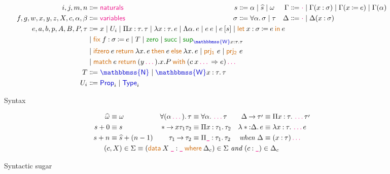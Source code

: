 \documentclass{article}
\title{}
\author{Jonathan Chan}
\newcommand{\meta}[1]{\mathsf{\textcolor{metacolour}{#1}}}
\newcommand{\ind}[1]{\mathsf{\textcolor{indcolour}{#1}}}
\newcommand{\constr}[1]{\mathsf{\textcolor{constrcolour}{#1}}}
\newcommand{\kw}[1]{\mathsf{\textcolor{kwcolour}{#1}}}
\newcommand{\kwopen}[1]{\kw{#1}\:}
\newcommand{\kwbin}[1]{\:\kw{#1}\:}
\newcommand{\pr}[1]{\raisebox{-#1pt}{$^\prime$}}
\newcommand{\taupr}{\tau\pr{2}}
\newcommand{\poly}[2]{\forall #1 \mathpunct{.} #2}
\newcommand{\suc}[1]{\widehat{#1}}
\newcommand{\fun}[3]{\Pi #1 \mathbin{:} #2 \mathpunct{.} #3}
\newcommand{\arr}[2]{#1 \mathbin{\rightarrow} #2}
\newcommand{\lam}[3]{\lambda #1 \mathbin{:} #2 \mathpunct{.} #3}
\newcommand{\Lam}[2]{\Lambda #1 \mathpunct{.} #2}
\newcommand{\app}[2]{#1 \: #2}
\newcommand{\App}[2]{#1 \: \mathopen{[} #2 \mathclose{]}}
\newcommand{\letin}[4]{\kwopen{let} \mathopen{} #1 \mathbin{:} #2 \mathbin{\coloneqq} #3 \kwbin{in} #4}
\newcommand{\Type}[1]{\ind{Type}_{#1}}
\newcommand{\Prop}[1]{\ind{Prop}_{#1}}
\newcommand{\match}[3]{\kwopen{match} #1 \kwbin{return} #2 \kwbin{with} #3}
\newcommand{\ifzero}[6]{\kwopen{ifzero} #1 \kwbin{return} \lambda #2 \mathpunct{.} #3 \kwbin{then} #4 \kwbin{else} \lambda #5 \mathpunct{.} #6}
\newcommand{\prja}[1]{\kwopen{prj_1} \;\! #1}
\newcommand{\prjb}[1]{\kwopen{prj_2} \;\! #1}
\newcommand{\fix}[3]{\kwopen{fix} #1 \mathbin{:} #2 \mathbin{\coloneqq} #3}
\newcommand{\data}[3]{\kwopen{data} #1 \mathbin{:} #2 \kwbin{where} #3}
\newcommand{\annot}[2]{#1 \mathbin{:} #2}
\newcommand{\define}[2]{#1 \mathbin{\coloneqq} #2}
\newcommand{\N}{\ind{\mathbbmss{N}}}
\newcommand{\zero}{\constr{zero}}
\renewcommand{\succ}{\constr{succ}}
\newcommand{\W}[3]{\ind{\mathbbmss{W}} #1 \mathbin{:} #2 \mathpunct{.} #3}
\renewcommand{\sup}{\ind{\constr{sup}}}
\newcommand{\nil}{\meta{\cdot}}
\newcommand{\seq}{\,\meta{\dots}\,}
\newcommand{\any}{\meta{\texttt{\_}}}
\begin{document}
\maketitle

\begin{figure}[h]
    \centering
    \begin{align*}
        i, j, m, n &\Coloneqq \meta{naturals}
        & s &\Coloneqq \alpha \mid \suc{s} \mid \omega 
        & \Gamma &\Coloneqq \nil \mid \Gamma(\annot{x}{\sigma}) \mid \Gamma(\define{x}{e}) \mid \Gamma(\alpha) \\
        f, g, w, x, y, z, X, c, \alpha, \beta &\Coloneqq \meta{variables}
        & \sigma &\Coloneqq \poly{\alpha}{\sigma} \mid \tau
        & \Delta &\Coloneqq \nil \mid \Delta(\annot{x}{\sigma}) \\
        e, a, b, p, A, B, P, \tau &\Coloneqq \mathrlap{x \mid U_{i} \mid \fun{x}{\tau}{\tau} \mid \lam{x}{\tau}{e} \mid \Lam{\alpha}{e} \mid \app{e}{e} \mid \App{e}{s} \mid \letin{x}{\sigma}{e}{e}} \\
        &\mid \mathrlap{\fix{f}{\sigma}{e} \mid T \mid \zero \mid \succ \mid \sup_{\W{x}{\tau}{\tau}}} \\
        &\mid \mathrlap{\ifzero{e}{x}{e}{e}{x}{e} \mid \prja{e} \mid \prjb{e}} \\
        &\mid \mathrlap{\match{e}{(y \seq).x.P}{(\app{c}{x \seq} \Rightarrow e) \seq}} \\
        T &\Coloneqq \N \mid \W{x}{\tau}{\tau} \\
        U_i &\Coloneqq \Prop{i} \mid \Type{i}
    \end{align*}
    \caption{Syntax}
    \label{fig:syntax}
\end{figure}

\begin{figure}[h]
    \centering
    \begin{align*}
        \suc{\omega} &\equiv \omega
        & \poly{(\alpha \seq)}{\tau} &\equiv \poly{\alpha}{\seq \tau}
        & \arr{\Delta}{\taupr} &\equiv \fun{x}{\tau}{\seq \taupr} \\
        s + 0 &\equiv s
        & \arr*{x}{\tau_1}{\tau_2} &\equiv \fun{x}{\tau_1}{\tau_2}
        & \lam*{\Delta}{e} &\equiv \lam{x}{\tau}{\seq e} \\
        s + n &\equiv \suc{s} + (n - 1)
        & \arr{\tau_1}{\tau_2} &\equiv \fun{\any}{\tau_1}{\tau_2}
        & \textit{when} ~ \Delta &\equiv (\annot{x}{\tau}) \seq \\
        &&\mathclap{(c, X) \in \Sigma \equiv (\data{\app{X}{\any}}{\any}{\Delta_c}) \in \Sigma ~ \textit{and} ~ (\annot{c}{\any}) \in \Delta_c}
    \end{align*}
    \caption{Syntactic sugar}
    \label{fig:sugar}
\end{figure}
\end{document}

